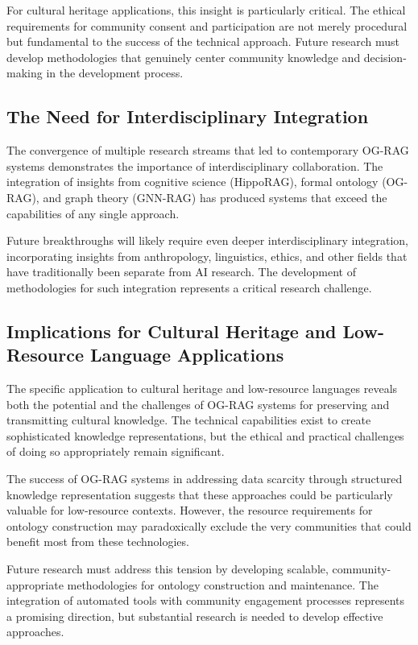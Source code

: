 For cultural heritage applications, this insight is particularly critical. The ethical requirements for community consent and participation are not merely procedural but fundamental to the success of the technical approach. Future research must develop methodologies that genuinely center community knowledge and decision-making in the development process.

\subsection{The Need for Interdisciplinary Integration}

The convergence of multiple research streams that led to contemporary OG-RAG systems demonstrates the importance of interdisciplinary collaboration. The integration of insights from cognitive science (HippoRAG), formal ontology (OG-RAG), and graph theory (GNN-RAG) has produced systems that exceed the capabilities of any single approach.

Future breakthroughs will likely require even deeper interdisciplinary integration, incorporating insights from anthropology, linguistics, ethics, and other fields that have traditionally been separate from AI research. The development of methodologies for such integration represents a critical research challenge.

\subsection{Implications for Cultural Heritage and Low-Resource Language Applications}

The specific application to cultural heritage and low-resource languages reveals both the potential and the challenges of OG-RAG systems for preserving and transmitting cultural knowledge. The technical capabilities exist to create sophisticated knowledge representations, but the ethical and practical challenges of doing so appropriately remain significant.

The success of OG-RAG systems in addressing data scarcity through structured knowledge representation suggests that these approaches could be particularly valuable for low-resource contexts. However, the resource requirements for ontology construction may paradoxically exclude the very communities that could benefit most from these technologies.

Future research must address this tension by developing scalable, community-appropriate methodologies for ontology construction and maintenance. The integration of automated tools with community engagement processes represents a promising direction, but substantial research is needed to develop effective approaches.

